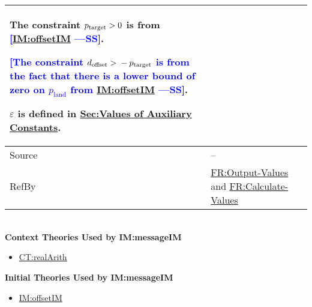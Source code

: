 \documentclass[12pt]{article}
\newcommand{\authornote}[3]{\textcolor{#1}{[#3 ---#2]}}
\newcommand{\authornote}[3]{}
\newcommand{\wss}[1]{\authornote{blue}{SS}{#1}}
\newcommand{\gt}{\ensuremath >}
\begin{document}
\begin{minipage}{\textwidth}
\begin{tabular}{>{\raggedright}p{}>{\raggedright\arraybackslash}p{}}
        The constraint ${p_{\text{target}}}\gt{}0$ is from \wss{\hyperref[IM:offsetIM]{IM:offsetIM}}.
        
        \wss{The constraint ${d_{\text{offset}}}\gt{}-{p_{\text{target}}}$ is from the fact that there is a lower bound of zero on ${p_{\text{land}}}$ from \hyperref[IM:offsetIM]{IM:offsetIM}}.
        
        $ε$ is defined in \hyperref[Sec:AuxConstants]{Sec:Values of Auxiliary Constants}.
        
\\ \midrule
Source & --
         
\\ \midrule
RefBy & \hyperref[outputValues]{FR:Output-Values} and \hyperref[calcValues]{FR:Calculate-Values}
        
\\ \bottomrule
\end{tabular}
\end{minipage}
~\\

\noindent \textbf{Context Theories Used by IM:messageIM}

\begin{itemize}
\item \hyperref[CT:realArith]{CT:realArith}
\end{itemize}

\noindent \textbf{Initial Theories Used by IM:messageIM}

\begin{itemize}
\item \hyperref[IM:offsetIM]{IM:offsetIM}
\end{itemize}
\end{document}
